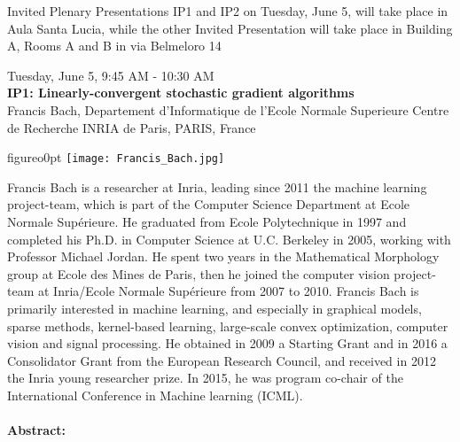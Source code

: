 {\small{Invited Plenary Presentations  IP1 and IP2 on Tuesday, June 5, will take place in Aula Santa Lucia, while the other Invited Presentation will take place in Building A, Rooms A and B in via Belmeloro 14}}
\newpage\vspace{2cm}
\begin{center}{\Large{
Tuesday, June 5, 9:45 AM - 10:30 AM \\
\textbf{IP1: Linearly-convergent stochastic gradient algorithms}\\
Francis Bach, Departement d'Informatique de l'Ecole Normale Superieure Centre de Recherche INRIA de Paris, PARIS, France}}
\end{center}
\vspace{1cm}

\begin{wrapfloat}{figure}{o}{0pt}
\texttt{[image: Francis\_Bach.jpg]}
\end{wrapfloat}

Francis Bach is a researcher at Inria, leading since 2011 the machine learning project-team, which is part of the Computer Science Department at Ecole Normale Sup\'erieure. He graduated from Ecole Polytechnique in 1997 and completed his Ph.D. in Computer Science at U.C. Berkeley in 2005, working with Professor Michael Jordan. He spent two years in the Mathematical Morphology group at Ecole des Mines de Paris, then he joined the computer vision project-team at Inria/Ecole Normale Sup\'erieure from 2007 to 2010. Francis Bach is primarily interested in machine learning, and especially in graphical models, sparse methods, kernel-based learning, large-scale convex optimization, computer vision and signal processing. He obtained in 2009 a Starting Grant and in 2016 a Consolidator Grant from the European Research Council, and received in 2012 the Inria young researcher prize. In 2015, he was program co-chair of the International Conference in Machine learning (ICML).\\\\

\textbf{Abstract:}\\

